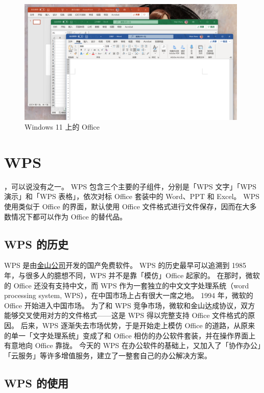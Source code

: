 \begin{figure}[htb!]
  \centering
  \includegraphics[width=11cm]{assets/Office_on_Win_11.png}
  \caption{Windows 11 上的 Office}
  \label{Office_on_Win_11}
\end{figure}

\section{WPS}

，可以说没有之一。
WPS 包含三个主要的子组件，分别是「WPS 文字」「WPS 演示」和「WPS 表格」，依次对标 Office 套装中的 Word、PPT 和 Excel。
WPS 使用类似于 Office 的界面，默认使用 Office 文件格式进行文件保存，因而在大多数情况下都可以作为 Office 的替代品。

\subsection{WPS 的历史}

WPS 是由\href{https://www.kingsoft.com/}{金山公司}开发的国产免费软件。
WPS 的历史最早可以追溯到 1985 年，与很多人的臆想不同，WPS 并不是靠「模仿」Office 起家的。
在那时，微软的 Office 还没有支持中文，而 WPS 作为一套独立的中文文字处理系统（word processing system, WPS），在中国市场上占有很大一席之地。
1994 年，微软的 Office 开始进入中国市场。
为了和 WPS 竞争市场，微软和金山达成协议，双方能够交叉使用对方的文件格式——这是 WPS 得以完整支持 Office 文件格式的原因。
后来，WPS 逐渐失去市场优势，于是开始走上模仿 Office 的道路，从原来的单一「文字处理系统」变成了和 Office 相仿的办公软件套装，并在操作界面上有意地向 Office 靠拢。
今天的 WPS 在办公软件的基础上，又加入了「协作办公」「云服务」等许多增值服务，建立了一整套自己的办公解决方案。

\subsection{WPS 的使用}

